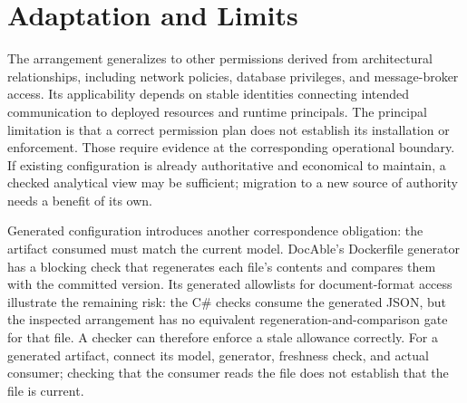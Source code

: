 \section{Adaptation and Limits}\label{heading:handbook-maintaining-coherence}

The arrangement generalizes to other permissions derived from architectural relationships, including network policies, database privileges, and message-broker access. Its applicability depends on stable identities connecting intended communication to deployed resources and runtime principals. The principal limitation is that a correct permission plan does not establish its installation or enforcement. Those require evidence at the corresponding operational boundary. If existing configuration is already authoritative and economical to maintain, a checked analytical view may be sufficient; migration to a new source of authority needs a benefit of its own.

Generated configuration introduces another correspondence obligation: the artifact consumed must match the current model. DocAble's Dockerfile generator has a blocking check that regenerates each file's contents and compares them with the committed version. Its generated allowlists for document-format access illustrate the remaining risk: the C# checks consume the generated JSON, but the inspected arrangement has no equivalent regeneration-and-comparison gate for that file. A checker can therefore enforce a stale allowance correctly. For a generated artifact, connect its model, generator, freshness check, and actual consumer; checking that the consumer reads the file does not establish that the file is current.
